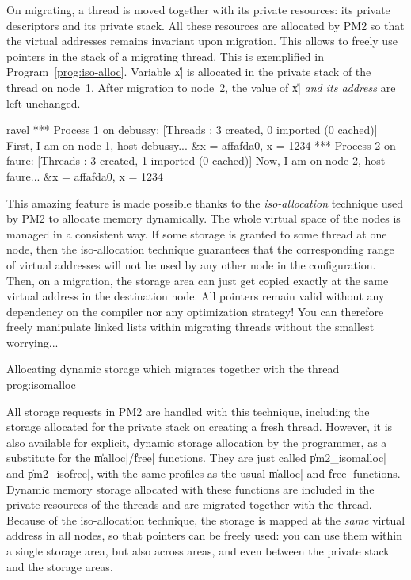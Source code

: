On migrating, a thread is moved together with its private resources:
its private descriptors and its private stack. All these resources are
allocated by PM2 so that the virtual addresses remains invariant upon
migration. This allows to freely use pointers in the stack of a
migrating thread. This is exemplified in
Program~\ref{prog:iso-alloc}. Variable \|x| is allocated in the
private stack of the thread on node~1. After migration to node~2, the value
of \|x| \emph{and its address} are left unchanged.
\begin{shell}
ravel%
*** Process 1 on debussy:
[Threads : 3 created, 0 imported (0 cached)]
First, I am on node 1, host debussy... &x = affafda0, x = 1234
*** Process 2 on faure:
[Threads : 3 created, 1 imported (0 cached)]
Now, I am on node 2, host faure... &x = affafda0, x = 1234
\end{shell}

This amazing feature is made possible thanks to the
\emph{iso-allocation} technique used by PM2 to allocate memory
dynamically. The whole virtual space of the nodes is managed in a
consistent way. If some storage is granted to some thread at one node,
then the iso-allocation technique guarantees that the corresponding
range of virtual addresses will not be used by any other node in the
configuration. Then, on a migration, the storage area can just get
copied exactly at the same virtual address in the destination node.
All pointers remain valid without any dependency on the compiler nor
any optimization strategy! You can therefore freely manipulate linked
lists within migrating threads without the smallest worrying...

 {Allocating dynamic storage which
  migrates together with the thread} {prog:isomalloc}

All storage requests in PM2 are handled with this technique, including
the storage allocated for the private stack on creating a fresh
thread.  However, it is also available for explicit, dynamic storage
allocation by the programmer, as a substitute for the
\|malloc|/\|free| functions. They are just called \|pm2_isomalloc| and
\|pm2_isofree|, with the same profiles as the usual \|malloc| and
\|free| functions.  Dynamic memory storage allocated with these
functions are included in the private resources of the threads and are
migrated together with the thread. Because of the iso-allocation
technique, the storage is mapped at the \emph{same} virtual address in
all nodes, so that pointers can be freely used: you can use them
within a single storage area, but also across areas, and even between
the private stack and the storage areas.

